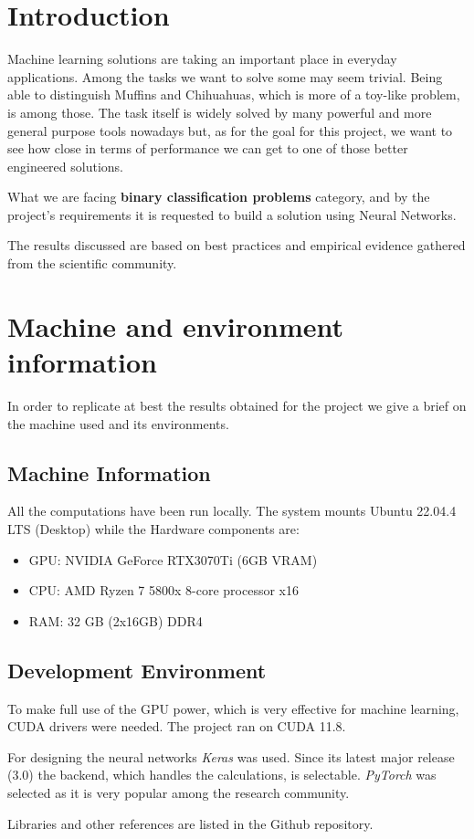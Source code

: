 \newpage


\section{Introduction}\label{sec:introduction}
Machine learning solutions are taking an important place in everyday applications.
Among the tasks we want to solve some may seem trivial.
Being able to distinguish Muffins and Chihuahuas, which is more of a toy-like problem, is among those.
The task itself is widely solved by many powerful and more general purpose tools nowadays but,
as for the goal for this project, we want to see how close in terms of performance we can get to one of those better engineered solutions.

What we are facing \textbf{binary classification problems} category,
and by the project's requirements it is requested to build a solution using Neural Networks.

The results discussed are based on best practices and empirical evidence gathered from the scientific community.


\section{Machine and environment information}\label{sec:machine-and-environment-information}
In order to replicate at best the results obtained for the project we give a brief on the machine used
and its environments.

\subsection{Machine Information}\label{subsec:machine-information}

All the computations have been run locally.
The system mounts Ubuntu 22.04.4 LTS (Desktop) while the Hardware components are:

\begin{itemize}
    \item GPU: NVIDIA GeForce RTX3070Ti (6GB VRAM)
    \item CPU: AMD Ryzen 7 5800x 8-core processor x16
    \item RAM: 32 GB (2x16GB) DDR4
\end{itemize}

\subsection{Development Environment}\label{subsec:development-environment}
To make full use of the GPU power, which is very effective for machine learning, CUDA drivers were needed. The project ran on CUDA 11.8.

For designing the neural networks \textit{Keras} was used. Since its latest major release (3.0)
the backend, which handles the calculations, is selectable.
\textit{PyTorch} was selected as it is very popular among the research community.

Libraries and other references are listed in the Github repository\cite{Fichera_Muffin_vs_Chihuahua_2024}.